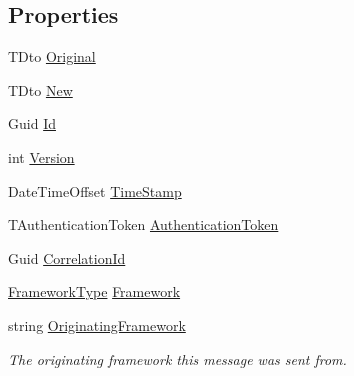 \subsection*{Properties}
\begin{DoxyCompactItemize}
\item 
T\+Dto \hyperlink{classCqrs_1_1Events_1_1DtoAggregateEvent_a62b5fa272dfbe104d8f37500e3d5cc45}{Original}
\item 
T\+Dto \hyperlink{classCqrs_1_1Events_1_1DtoAggregateEvent_a702bd5605d7ce538b992c2d43198194c}{New}
\item 
Guid \hyperlink{classCqrs_1_1Events_1_1DtoAggregateEvent_ad5f763ecd79dc9b4882ed15239242d17}{Id}
\item 
int \hyperlink{classCqrs_1_1Events_1_1DtoAggregateEvent_a2c3a579eba3effd19cf0ae740ca33389}{Version}
\item 
Date\+Time\+Offset \hyperlink{classCqrs_1_1Events_1_1DtoAggregateEvent_a0acde01c4c3cf985f7fc170bc9658278}{Time\+Stamp}
\item 
T\+Authentication\+Token \hyperlink{classCqrs_1_1Events_1_1DtoAggregateEvent_a536e92af26632a9590e2ed590232cfcf}{Authentication\+Token}
\item 
Guid \hyperlink{classCqrs_1_1Events_1_1DtoAggregateEvent_a0736560199765e66c50963dfa767b5a5}{Correlation\+Id}
\item 
\hyperlink{namespaceCqrs_1_1Messages_af06a7e6cd2609043d0f2f5f3419f81e3}{Framework\+Type} \hyperlink{classCqrs_1_1Events_1_1DtoAggregateEvent_ad290d76926bccd9038dc5399d037a2ff}{Framework}
\item 
string \hyperlink{classCqrs_1_1Events_1_1DtoAggregateEvent_a40b1390a4f0441deeb1ef766d6903323}{Originating\+Framework}
\begin{DoxyCompactList}\small\item\em The originating framework this message was sent from. \end{DoxyCompactList}\item 

\end{DoxyCompactItemize}
